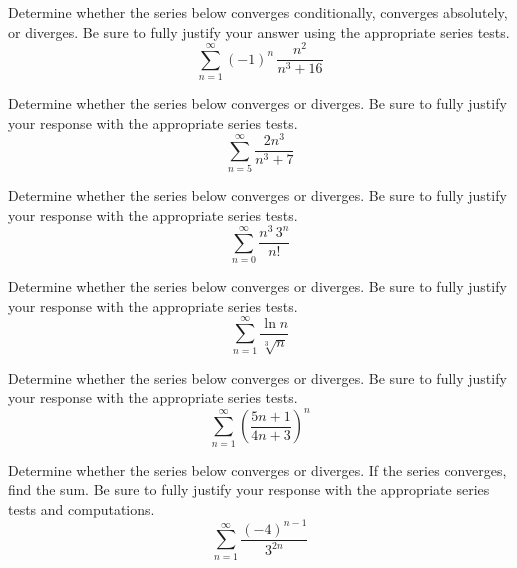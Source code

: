 \documentclass[12pt,letterpaper]{exam}
\begin{document}
\examtitle
{} 
\scores
\bottomline
\newpage


\begin{questions}

\newpage
\question[25] Determine whether the series below converges conditionally, converges absolutely, or diverges. Be sure to fully justify your answer using the appropriate series tests.
	\[
	\sum_{n=1}^\infty (-1)^n \, \dfrac{n^2}{n^3 + 16}
	\]



\newpage
\question[10] Determine whether the series below converges or diverges. Be sure to fully justify your response with the appropriate series tests.
	\[
	\sum_{n=5}^\infty \dfrac{2n^3}{n^3 + 7} 
	\]



\newpage
\question[10] Determine whether the series below converges or diverges. Be sure to fully justify your response with the appropriate series tests.
	\[
	\sum_{n=0}^\infty \dfrac{n^3 \, 3^n}{n!}
	\]



\newpage
\question[10] Determine whether the series below converges or diverges. Be sure to fully justify your response with the appropriate series tests.
	\[
	\sum_{n=1}^\infty \dfrac{\ln n}{\sqrt[3]{n}}
	\]



\newpage
\question[10] Determine whether the series below converges or diverges. Be sure to fully justify your response with the appropriate series tests.
	\[
	\sum_{n=1}^\infty \left( \dfrac{5n + 1}{4n + 3} \right)^n
	\]



\newpage
\question[10] Determine whether the series below converges or diverges. If the series converges, find the sum. Be sure to fully justify your response with the appropriate series tests and computations. 
	\[
	\sum_{n=1}^\infty \dfrac{(-4)^{n-1}}{3^{2n}}
	\]




\end{questions}
\end{document}
